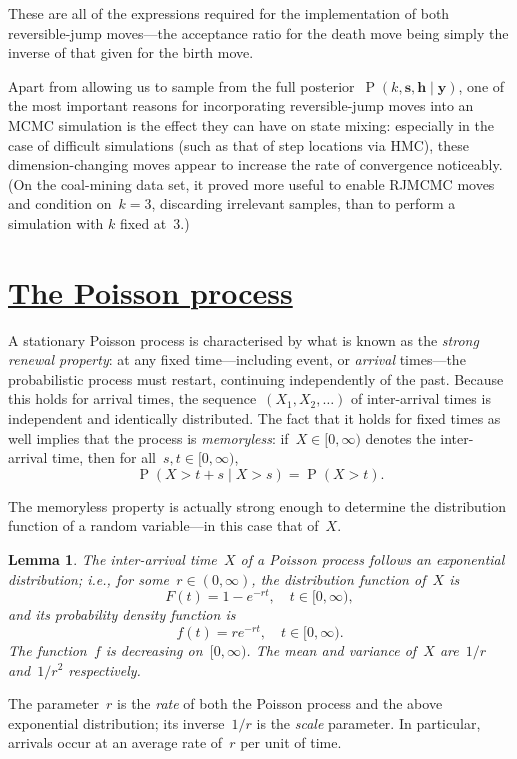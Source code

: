 \documentclass[11pt,a4paper]{article}
\newcommand\ub[1]{\symbf{#1}}                    %
\DeclareMathOperator\Pb{P}                       %
\newtheorem{lem}{Lemma}
\theoremstyle{definition}
\begin{document}
These are all of the expressions required for the implementation of both
reversible-jump moves---the acceptance ratio for the death move being simply the
inverse of that given for the birth move.

Apart from allowing us to sample from the full posterior~$\Pb(k,\ub{s},\ub{h}
\mid \ub{y})$, one of the most important reasons for incorporating
reversible-jump moves into an MCMC simulation is the effect they can have on
state mixing: especially in the case of difficult simulations (such as that of
step locations via HMC), these dimension-changing moves appear to increase the
rate of convergence noticeably. (On the coal-mining data set, it proved more
useful to enable RJMCMC moves and condition on~$k = 3$, discarding irrelevant
samples, than to perform a simulation with $k$ fixed at~$3$.)

\section %
  {\href{http://www.randomservices.org/random/poisson/index.html}
  {The Poisson process}}

A stationary Poisson process is characterised by what is known as the
\emph{strong renewal property}: at any fixed time---including event, or
\emph{arrival} times---the probabilistic process must restart, continuing
independently of the past. Because this holds for arrival times, the
sequence~$(X_1,X_2,\dots)$ of inter-arrival times is independent and identically
distributed. The fact that it holds for fixed times as well implies that the
process is \emph{memoryless}: if~$X \in [0,\infty)$ denotes the inter-arrival
time, then for all~$s,t \in [0,\infty)$,
\[ \Pb(X > t + s \mid X > s) = \Pb(X > t). \]

The memoryless property is actually strong enough to determine the distribution
function of a random variable---in this case that of~$X$.
\begin{lem}
The inter-arrival time~$X$ of a Poisson process follows an exponential
distribution; i.e., for some~$r \in (0,\infty)$, the distribution function
of~$X$ is
\[ F(t) = 1 - e^{-rt}, \quad t \in [0,\infty), \]
and its probability density function is
\[ f(t) = re^{-rt}, \quad t \in [0,\infty). \]
The function~$f$ is decreasing on~$[0,\infty)$. The mean and variance of~$X$
are~$1/r$ and~$1/r^2$ respectively.
\end{lem}
The parameter~$r$ is the \emph{rate} of both the Poisson process and the above
exponential distribution; its inverse~$1/r$ is the \emph{scale} parameter. In
particular, arrivals occur at an average rate of~$r$ per unit of time.
\end{document}
